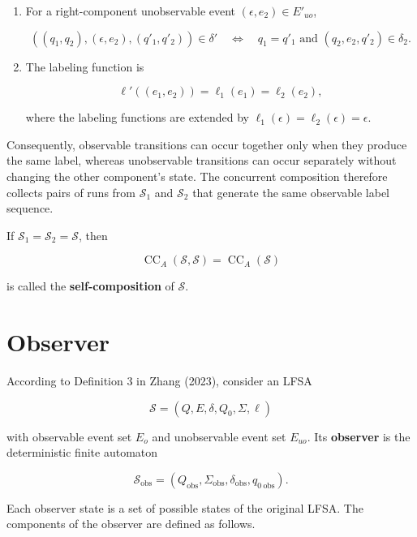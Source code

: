 \documentclass[11pt]{article}
\begin{document}
\begin{enumerate}
\item For a right-component unobservable event $(\epsilon,e_2)\in E'_{uo}$,

\[
   ((q_1,q_2),(\epsilon,e_2),(q'_1,q'_2))\in\delta'
   \quad\Longleftrightarrow\quad
   q_1=q'_1
   \text{ and }
   (q_2,e_2,q'_2)\in\delta_2.
\]

\item The labeling function is

\[
   \ell'((e_1,e_2))
   =\ell_1(e_1)
   =\ell_2(e_2),
\]

where the labeling functions are extended by $\ell_1(\epsilon)=\ell_2(\epsilon)=\epsilon$.

\end{enumerate}

Consequently, observable transitions can occur together only when they produce the same label, whereas unobservable transitions can occur separately without changing the other component's state. The concurrent composition therefore collects pairs of runs from $\mathcal S_1$ and $\mathcal S_2$ that generate the same observable label sequence.

If $\mathcal S_1=\mathcal S_2=\mathcal S$, then

\[
\operatorname{CC}_{A}(\mathcal S,\mathcal S)
=\operatorname{CC}_{A}(\mathcal S)
\]

is called the \textbf{self-composition} of $\mathcal S$.

\section{Observer}


According to Definition 3 in Zhang (2023), consider an LFSA

\[
\mathcal S=(Q,E,\delta,Q_0,\Sigma,\ell)
\]

with observable event set $E_o$ and unobservable event set $E_{uo}$. Its \textbf{observer} is the deterministic finite automaton

\[
\mathcal S_{\mathrm{obs}}
=(Q_{\mathrm{obs}},\Sigma_{\mathrm{obs}},
\delta_{\mathrm{obs}},q_{0\ \mathrm{obs}}).
\]

Each observer state is a set of possible states of the original LFSA. The components of the observer are defined as follows.
\end{document}
